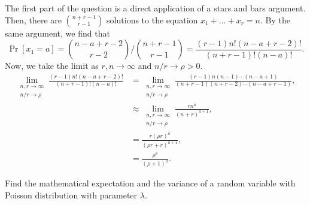 \begin{solution}
    The first part of the question is a direct application of a stars and bars
    argument. Then, there are $\binom{n+r-1}{r-1}$ solutions to the equation
    $x_1 + \ldots + x_r = n$. By the same argument, we find that 
    \[
        \Pr\left[{x_1 = a}\right] = \binom{n-a+r-2}{r-2} / \binom{n+r-1}{r-1} =  \frac{(r-1)n!(n-a+r-2)!}{(n+r-1)!(n-a)!}.
    \]
    Now, we take the limit as $r,n\to\infty$ and $n/r \to \rho > 0$. 
    \begin{align*}
        \lim_{\substack{n,r\to\infty\\ n/r\to\rho}}  \frac{(r-1)n!(n-a+r-2)!}{(n+r-1)!(n-a)!} &= \lim_{\substack{n,r\to\infty\\ n/r\to\rho}} \frac{(r-1)n(n-1)\cdots (n-a+1)}{(n+r-1)(n+r-2)\cdots (n-a+r-1)}, \\
        &\approx  \lim_{\substack{n,r\to\infty\\ n/r\to\rho}} \frac{rn^a}{(n+r)^{a+1}}, \\
        &= \frac{r(\rho r)^a}{(\rho r + r)^{a+1}}, \\
        &= \frac{\rho^a}{(\rho + 1)^a}.
    \end{align*}
\end{solution}
\begin{problem}{7}
    Find the mathematical expectation and the variance of a random variable with Poisson distribution with parameter $\lambda$.
\end{problem}
